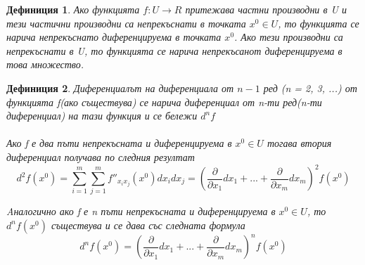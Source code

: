 \documentclass[fleqn]{article}
\newtheorem{definition}{Дефиниция}[subsection]
\begin{document}
\begin{definition}
Ако функцията $f: U \rightarrow R$ притежава частни производни в U и тези частични производни са непрекъснати в точката $x^0 \in U$, то функцията се нарича непрекъснато диференцируема в точката $x^0$. Ако тези производни са непрекъснати в U, то функцията се нарича непрекъсанот диференцируема в това множество. 
\end{definition}

\begin{definition}
Диференциалът на диференциала от $n-1$ ред (n = 2, 3, ...) от функцията f(ако съществува) се нарича диференциал от n-ти ред(n-ти диференциал) на тази функция и се бележи $d^n f$\\
\\
Ако f е два пъти непрекъсната и диференцируема в $x^0 \in U$ тогава втория диференциал получава по следния резултат
$$d^2 f(x^0) = \sum_{i=1}^ m \sum_{j=1}^m f''_{x_i x_j}(x^0) dx_i dx_j = \left( \dfrac{\partial}{\partial x_1}dx_1 + ... + \dfrac{\partial}{\partial x_m}dx_m\right )^2 f(x^0)$$

Aналогично ако f е n пъти непрекъсната и диференцируема в $x^0 \in U$, то $d^n f(x^0)$ съществува и се дава със следната формула 
$$d^n f(x^0) = \left( \dfrac{\partial}{\partial x_1}dx_1 + ... + \dfrac{\partial}{\partial x_m}dx_m\right )^n f(x^0)$$
\end{definition}
\end{document}
